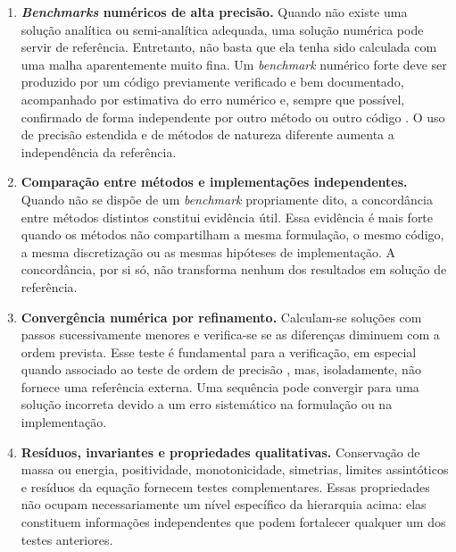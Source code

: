 \begin{enumerate}
\item \textbf{{\it Benchmarks} numéricos de alta precisão.} Quando não existe uma solução analítica ou semi-analítica adequada, uma solução numérica pode servir de referência. Entretanto, não basta que ela tenha sido calculada com uma malha aparentemente muito fina. Um {\it benchmark} numérico forte deve ser produzido por um código previamente verificado e bem documentado, acompanhado por estimativa do erro numérico e, sempre que possível, confirmado de forma independente por outro método ou outro código \cite{OberkampfTrucano2008}. O uso de precisão estendida e de métodos de natureza diferente aumenta a independência da referência.

\item \textbf{Comparação entre métodos e implementações independentes.} Quando não se dispõe de um {\it benchmark} propriamente dito, a concordância entre métodos distintos constitui evidência útil. Essa evidência é mais forte quando os métodos não compartilham a mesma formulação, o mesmo código, a mesma discretização ou as mesmas hipóteses de implementação. A concordância, por si só, não transforma nenhum dos resultados em solução de referência.

\item \textbf{Convergência numérica por refinamento.} Calculam-se soluções com passos sucessivamente menores e verifica-se se as diferenças diminuem com a ordem prevista. Esse teste é fundamental para a verificação, em especial quando associado ao teste de ordem de precisão \cite{Roy2005Verification,KnuppSalari2003}, mas, isoladamente, não fornece uma referência externa. Uma sequência pode convergir para uma solução incorreta devido a um erro sistemático na formulação ou na implementação.

\item \textbf{Resíduos, invariantes e propriedades qualitativas.} Conservação de massa ou energia, positividade, monotonicidade, simetrias, limites assintóticos e resíduos da equação fornecem testes complementares. Essas propriedades não ocupam necessariamente um nível específico da hierarquia acima: elas constituem informações independentes que podem fortalecer qualquer um dos testes anteriores.
\end{enumerate}

